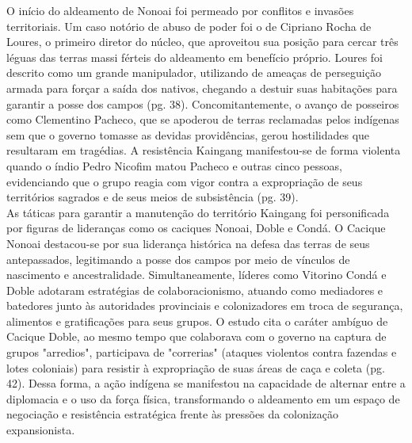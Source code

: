 \documentclass[12pt, a4paper]{article}
\begin{document}
O início do aldeamento de Nonoai foi permeado por conflitos e invasões territoriais. Um caso notório de abuso de poder foi o de Cipriano Rocha de Loures, o primeiro diretor do núcleo, que aproveitou sua posição para cercar três léguas das terras massi férteis do aldeamento em benefício próprio. Loures foi descrito como um grande manipulador, utilizando de ameaças de perseguição armada para forçar a saída dos nativos, chegando a destuir suas habitações para garantir a posse dos campos (pg. 38). Concomitantemente, o avanço de posseiros como Clementino Pacheco, que se apoderou de terras reclamadas pelos indígenas sem que o governo tomasse as devidas providências, gerou hostilidades que resultaram em tragédias. A resistência Kaingang manifestou-se de forma violenta quando o índio Pedro Nicofim matou Pacheco e outras cinco pessoas, evidenciando que o grupo reagia com vigor contra a expropriação de seus territórios sagrados e de seus meios de subsistência (pg. 39).
\\

As táticas para garantir a manutenção do território Kaingang foi personificada por figuras de lideranças como os caciques Nonoai, Doble e Condá. O Cacique Nonoai destacou-se por sua liderança histórica na defesa das terras de seus antepassados, legitimando a posse dos campos por meio de vínculos de nascimento e ancestralidade. Simultaneamente, líderes como Vitorino Condá e Doble adotaram estratégias de colaboracionismo, atuando como mediadores e batedores junto às autoridades provinciais e colonizadores em troca de segurança, alimentos e gratificações para seus grupos. O estudo cita o caráter ambíguo de Cacique Doble, ao mesmo tempo que colaborava com o governo na captura de grupos "arredios", participava de "correrias" (ataques violentos contra fazendas e lotes coloniais) para resistir à expropriação de suas áreas de caça e coleta (pg. 42). Dessa forma, a ação indígena se manifestou na capacidade de alternar entre a diplomacia e o uso da força física, transformando o aldeamento em um espaço de negociação e resistência estratégica frente às pressões da colonização expansionista.
\\
\end{document}
